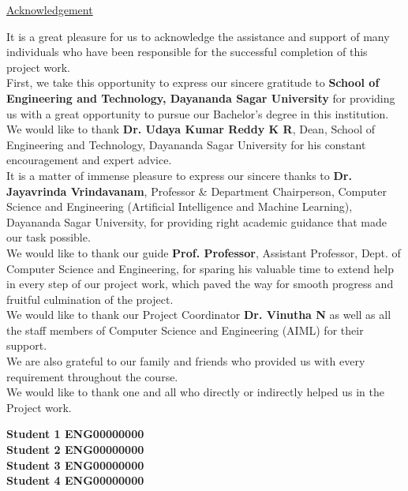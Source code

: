 \documentclass[ 12pt,a4paper,twocolumn,fleqn]{article}
\begin{document}
\begin{center}
\LARGE{{\underline{Acknowledgement}}} \\
\end{center}
\normalsize
It is a great pleasure for us to acknowledge the assistance and support of many individuals who have been responsible for the successful completion of this project work.
\\
First, we take this opportunity to express our sincere gratitude to \textbf{School of Engineering and Technology, Dayananda Sagar University} for providing us with a great opportunity to pursue our Bachelor’s degree in this institution.
\\
We would like to thank \textbf{Dr. Udaya Kumar Reddy K R}, Dean, School of Engineering and Technology, Dayananda Sagar University for his constant encouragement and expert advice.
\\
It is a matter of immense pleasure to express our sincere thanks to \textbf{Dr. Jayavrinda Vrindavanam}, Professor \& Department Chairperson, Computer Science and Engineering (Artificial Intelligence and Machine Learning), Dayananda Sagar University, for providing right academic guidance that made our task possible.
\\
We would like to thank our guide \textbf{Prof. Professor}, Assistant Professor, Dept. of Computer Science and Engineering, for sparing his valuable time to extend help in every step of our project work, which paved the way for smooth progress and fruitful culmination of the project.
\\
We would like to thank our Project Coordinator \textbf{Dr. Vinutha N} as well as all the staff members of Computer Science and Engineering (AIML) for their support.
\\
We are also grateful to our family and friends who provided us with every requirement throughout the course.
\\
We would like to thank one and all who directly or indirectly helped us in the Project work.


\begin{flushright}
\textbf{Student 1 \space ENG00000000} \\
\textbf{Student 2 \space ENG00000000} \\
\textbf{Student 3 \space ENG00000000} \\
\textbf{Student 4 \space ENG00000000} \\
\end{flushright}


\newpage
  \pagestyle{fancy}
\thisfancypage{%
  \setlength{\fboxsep}{20pt}\doublebox}{}
  
\end{document}
